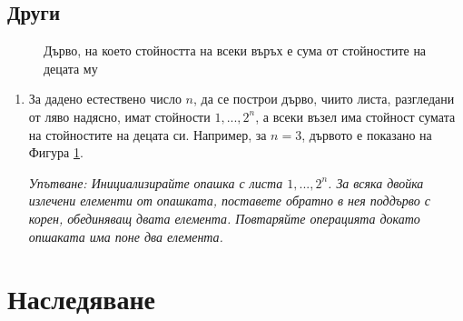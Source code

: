 \subsection{Други}


\begin{figure}[h]
	\centering
{}
	\caption{Дърво, на което стойността на всеки въръх е сума от стойностите на децата му}
	\label{fig:bottomup}
\end{figure}

\begin{enumerate}[resume]
	\item За дадено естествено число $n$, да се построи дърво, чиито листа, разгледани от ляво надясно, имат стойности $1,...,2^n$, а всеки възел има стойност сумата на стойностите на децата си. Например, за $n=3$, дървото е показано на Фигура \ref{fig:bottomup}.

	\emph{Упътване: Инициализирайте опашка с листа $1,...,2^n$. За всяка двойка излечени елементи от опашката, поставете обратно в нея поддърво с корен, обединяващ двата елемента. Повтаряйте операцията докато опшаката има поне два елемента.}
\end{enumerate}

\section {Наследяване}

